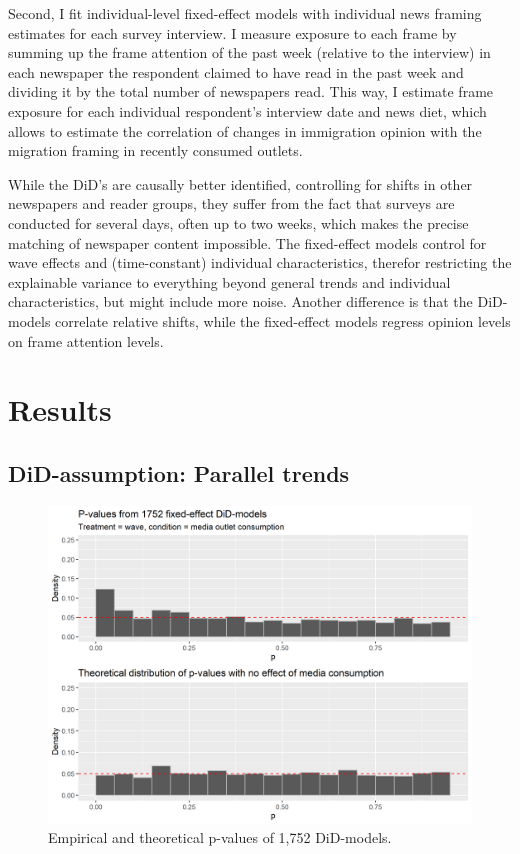 \documentclass{article}
\begin{document}
Second, I fit individual-level fixed-effect models with individual news framing estimates for each survey interview. I measure exposure to each frame by summing up the frame attention of the past week (relative to the interview) in each newspaper the respondent claimed to have read in the past week and dividing it by the total number of newspapers read. This way, I estimate frame exposure for each individual respondent's interview date and news diet, which allows to estimate the correlation of changes in immigration opinion with the migration framing in recently consumed outlets.

While the DiD's are causally better identified, controlling for shifts in other newspapers and reader groups, they suffer from the fact that surveys are conducted for several days, often up to two weeks, which makes the precise matching of newspaper content impossible. The fixed-effect models control for wave effects and (time-constant) individual characteristics, therefor restricting the explainable variance to everything beyond general trends and individual characteristics, but might include more noise. Another difference is that the DiD-models correlate relative shifts, while the fixed-effect models regress opinion levels on frame attention levels.


\section{Results}

\subsection{DiD-assumption: Parallel trends}

\begin{figure}[!ht]
    \centering
    \includegraphics[width=\textwidth]{paper/vis/DiD_model_ps.png}
    \caption{Empirical and theoretical p-values of 1,752 DiD-models.}
    \label{fig:p_values}
\end{figure}
\end{document}
